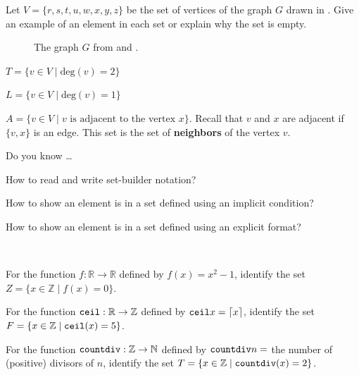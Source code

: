 \begin{exer}[\exerU] %
\label{exer_set_verts}
    Let $V=\{r,s,t,u,w,x,y,z\}$ be the set of vertices of the graph $G$ drawn in . Give an example of an element in each set or explain why the set is empty.

    \begin{figure} [hbtp]
        \centering
        
        \caption{The graph $G$ from   and  .}
        \label{fig_graph_setbuilder} 
    \end{figure}

        \begin{exerpart}  
            \item $T = \{ v \in V \mid \text{deg}(v) = 2\}$
            \item $L = \{ v \in V \mid \text{deg}(v) = 1\}$
            \item $A = \{ v \in V \mid v \text{ is adjacent to the vertex } x\}$.  Recall that $v$ and $x$ are adjacent if $\{v,x\}$ is an edge. This set is the set of \textbf{neighbors} of the vertex $v$.
        \end{exerpart}
\end{exer}

\begin{exer}[\exerR] %
\label{exer_dyk_setbuilder_notation}
    Do you know \ldots
        \begin{exerpart}
            \item How to read and write set-builder notation?
            \item How to show an element is in a set defined using an implicit condition?
            \item How to show an element is in a set defined using an explicit format?
        \end{exerpart}
\end{exer}

\begin{exer}[\exerE] %
\label{exer_preimage}
~
    \begin{exerpart}
        \item For the function $f: \mathbb{R} \to \mathbb{R}$ defined by $f(x) = x^2-1$, identify the set $Z = \{x \in \mathbb{Z} \mid f(x) = 0\}$.
        \item For the function $\texttt{ceil}: \mathbb{R} \to \mathbb{Z}$ defined by $\texttt{ceil}{x}=\lceil x \rceil$, identify the set $F=\{x \in \mathbb{Z} \mid \texttt{ceil}(x) = 5\}$.
        \item For the function $\texttt{countdiv}: \mathbb{Z} \to \mathbb{N}$ defined by $\texttt{countdiv}{n}=$ the number of (positive) divisors of $n$, identify the set $T = \{x \in \mathbb{Z} \mid \texttt{countdiv}(x) = 2\}$.
       \end{exerpart}
\end{exer}

